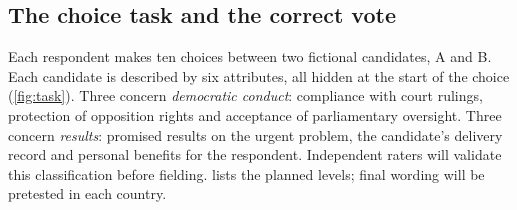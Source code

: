 \documentclass[11pt]{article}
\begin{document}
\subsection{The choice task and the correct vote}

Each respondent makes ten choices between two fictional candidates, A and B. Each candidate is described by six attributes, all hidden at the start of the choice (\cref{fig:task}). Three concern \emph{democratic conduct}: compliance with court rulings, protection of opposition rights and acceptance of parliamentary oversight. Three concern \emph{results}: promised results on the urgent problem, the candidate's delivery record and personal benefits for the respondent. Independent raters will validate this classification before fielding.  lists the planned levels; final wording will be pretested in each country.
\end{document}
